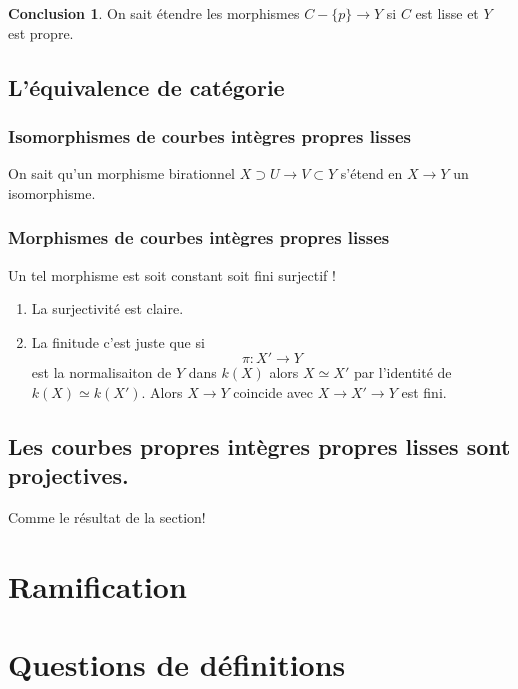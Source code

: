 \documentclass[a4paper,12pt]{book}
\theoremstyle{plain}
\theoremstyle{definition}
\newtheorem{concl}{Conclusion}
\theoremstyle{remark}
\begin{document}
\begin{concl}
  On sait étendre les morphismes $C-\{p\} \to Y$ 
  si $C$ est lisse et $Y$ est propre.
\end{concl}
\section{L'équivalence de catégorie}
\subsection{Isomorphismes de courbes intègres propres lisses}
On sait qu'un morphisme birationnel $X\supset U\to V\subset Y$
s'étend en $X\to Y$ un isomorphisme.

\subsection{Morphismes de courbes intègres propres lisses}
Un tel morphisme est soit constant soit fini surjectif ! 
\begin{enumerate}
  \item La surjectivité est claire.
  \item La finitude c'est juste que si
    \[\pi \colon X'\to Y\]
    est la normalisaiton de $Y$ dans $k(X)$ alors
    $X\simeq X'$ par l'identité de $k(X)\simeq k(X')$.
    Alors $X\to Y$ coincide avec $X\to X'\to Y$ est fini.
\end{enumerate}

\section{Les courbes propres intègres propres lisses sont projectives.}
Comme le résultat de la section!

\chapter{Ramification}
\section{}


\chapter{Questions de définitions}
\end{document}
